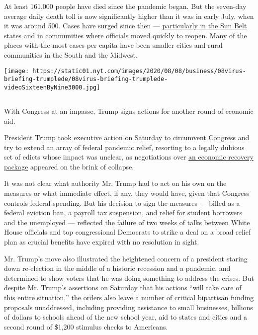 At least 161,000 people have died since the pandemic began. But the
seven-day average daily death toll is now significantly higher than it
was in early July, when it was around 500. Cases have surged since then
---
\href{https://www.nytimes.com/2020/06/14/us/coronavirus-united-states.html}{particularly
in the Sun Belt states} and in communities where officials moved quickly
to
\href{https://www.nytimes.com/interactive/2020/07/09/us/coronavirus-cases-reopening-trends.html}{reopen}.
Many of the places with the most cases per capita have been smaller
cities and rural communities in the South and the Midwest.

\texttt{[image: https://static01.nyt.com/images/2020/08/08/business/08virus-briefing-trumplede/08virus-briefing-trumplede-videoSixteenByNine3000.jpg]}

\hypertarget{section-1}{%
\subsection{}\label{section-1}}

With Congress at an impasse, Trump signs actions for another round of
economic aid.

President Trump took executive action on Saturday to circumvent Congress
and try to extend an array of federal pandemic relief, resorting to a
legally dubious set of edicts whose impact was unclear, as negotiations
over
\href{https://www.nytimes.com/2020/08/08/world/coronavirus-updates.html}{an
economic recovery package} appeared on the brink of collapse.

It was not clear what authority Mr. Trump had to act on his own on the
measures or what immediate effect, if any, they would have, given that
Congress controls federal spending. But his decision to sign the
measures --- billed as a federal eviction ban, a payroll tax suspension,
and relief for student borrowers and the unemployed --- reflected the
failure of two weeks of talks between White House officials and top
congressional Democrats to strike a deal on a broad relief plan as
crucial benefits have expired with no resolution in sight.

Mr. Trump's move also illustrated the heightened concern of a president
staring down re-election in the middle of a historic recession and a
pandemic, and determined to show voters that he was doing something to
address the crises. But despite Mr. Trump's assertions on Saturday that
his actions ``will take care of this entire situation,'' the orders also
leave a number of critical bipartisan funding proposals unaddressed,
including providing assistance to small businesses, billions of dollars
to schools ahead of the new school year, aid to states and cities and a
second round of \$1,200 stimulus checks to Americans.

